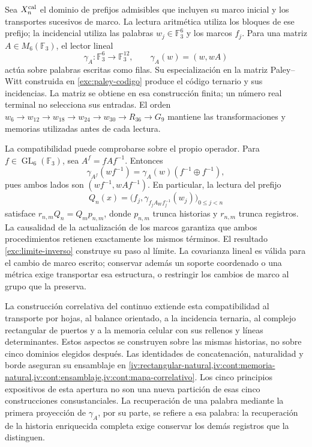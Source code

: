 Sea \(X_n^{\rm cal}\) el dominio de prefijos admisibles que incluyen
su marco inicial y los transportes sucesivos de marco. La lectura aritmética
utiliza los bloques de ese prefijo; la incidencial utiliza las palabras
\(w_j\in\mathbb F_3^6\) y los marcos \(f_j\). Para una matriz
\(A\in M_6(\mathbb F_3)\), el lector lineal
\[
 \gamma_A:\mathbb F_3^6\longrightarrow\mathbb F_3^{12},
 \qquad \gamma_A(w)=(w,wA)
\]
actúa sobre palabras escritas como filas. Su especialización en la matriz
Paley--Witt construida en \cref{exc:paley-codigo} produce el código
ternario y sus incidencias. La matriz se obtiene en esa construcción
finita; un número real terminal no selecciona sus entradas. El orden
\(w_6\to w_{12}\to w_{18}\to w_{24}\to w_{30}\to R_{36}\to G_9\)
mantiene las transformaciones y memorias utilizadas antes de cada lectura.

La compatibilidad puede comprobarse sobre el propio operador. Para
\(f\in\operatorname{GL}_6(\mathbb F_3)\), sea
\(A^f=fAf^{-1}\). Entonces
\[
 \gamma_{A^f}(wf^{-1})
      =\gamma_A(w)(f^{-1}\oplus f^{-1}),
\]
pues ambos lados son \((wf^{-1},wAf^{-1})\). En particular, la lectura
del prefijo
\[
 Q_n(x)=\bigl(f_j,
       \gamma_{f_jA_Wf_j^{-1}}(w_j)\bigr)_{0\leq j<n}
\]
satisface \(r_{n,m}Q_n=Q_m p_{n,m}\), donde \(p_{n,m}\) trunca
historias y \(r_{n,m}\) trunca registros. La causalidad de la
actualización de los marcos garantiza que ambos procedimientos retienen
exactamente los mismos términos. El resultado
\cref{exc:limite-inverso} construye su paso al límite. La covarianza lineal
es válida para el cambio de marco escrito; conservar además un soporte
coordenado o una métrica exige transportar esa estructura, o restringir los
cambios de marco al grupo que la preserva.

La construcción correlativa del continuo extiende esta compatibilidad al
transporte por hojas, al balance orientado, a la incidencia ternaria, al
complejo rectangular de puertos y a la memoria celular con sus rellenos y
líneas determinantes. Estos aspectos se construyen sobre las mismas
historias, no sobre cinco dominios elegidos después. Las identidades de
concatenación, naturalidad y borde aseguran su ensamblaje en
\cref{iv:rectangular-natural,iv:cont:memoria-natural,iv:cont:ensamblaje,iv:cont:mapa-correlativo}.
Los cinco principios expositivos de esta apertura no son una nueva
partición de esas cinco construcciones consustanciales. La recuperación
de una palabra mediante la primera proyección de \(\gamma_A\), por su
parte, se refiere a esa palabra: la recuperación de la historia enriquecida
completa exige conservar los demás registros que la distinguen.


